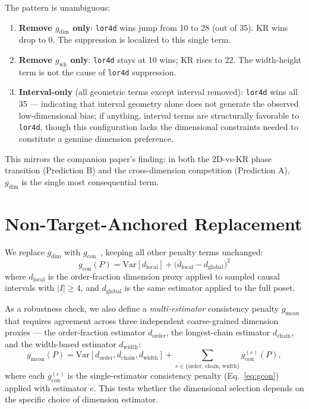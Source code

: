 \documentclass[11pt,a4paper]{article}
\begin{document}
The pattern is unambiguous:
\begin{enumerate}[nosep]
    \item \textbf{Remove $g_{\text{dim}}$ only}: \texttt{lor4d} wins jump from 10 to 28 (out of 35). KR wins drop to 0. The suppression is localized to this single term.
    \item \textbf{Remove $g_{\text{wh}}$ only}: \texttt{lor4d} stays at 10 wins; KR rises to 22. The width-height term is not the cause of \texttt{lor4d} suppression.
    \item \textbf{Interval-only} (all geometric terms except interval removed): \texttt{lor4d} wins all 35 --- indicating that interval geometry alone does not generate the observed low-dimensional bias; if anything, interval terms are structurally favorable to \texttt{lor4d}, though this configuration lacks the dimensional constraints needed to constitute a genuine dimension preference.
\end{enumerate}

This mirrors the companion paper's finding: in both the 2D-vs-KR phase transition (Prediction B) and the cross-dimension competition (Prediction A), $g_{\text{dim}}$ is the single most consequential term.

\section{Non-Target-Anchored Replacement}\label{sec:replacement}

We replace $g_{\text{dim}}$ with $g_{\text{con}}$~\cite{zhang2026companion}, keeping all other penalty terms unchanged:
\begin{equation}
    g_{\text{con}}(P) = \text{Var}[d_{\text{local}}] + \bigl(\overline{d}_{\text{local}} - d_{\text{global}}\bigr)^2
    \label{eq:gcon}
\end{equation}
where $d_{\text{local}}$ is the order-fraction dimension proxy applied to sampled causal intervals with $|I| \geq 4$, and $d_{\text{global}}$ is the same estimator applied to the full poset.

As a robustness check, we also define a \emph{multi-estimator} consistency penalty $g_{\text{mcon}}$ that requires agreement across three independent coarse-grained dimension proxies --- the order-fraction estimator $d_{\text{order}}$, the longest-chain estimator $d_{\text{chain}}$, and the width-based estimator $d_{\text{width}}$:
\begin{equation}
    g_{\text{mcon}}(P) = \text{Var}[d_{\text{order}}, d_{\text{chain}}, d_{\text{width}}] + \sum_{e \in \{\text{order, chain, width}\}} g_{\text{con}}^{(e)}(P),
    \label{eq:gmcon}
\end{equation}
where each $g_{\text{con}}^{(e)}$ is the single-estimator consistency penalty (Eq.~\ref{eq:gcon}) applied with estimator $e$. This tests whether the dimensional selection depends on the specific choice of dimension estimator.
\end{document}
